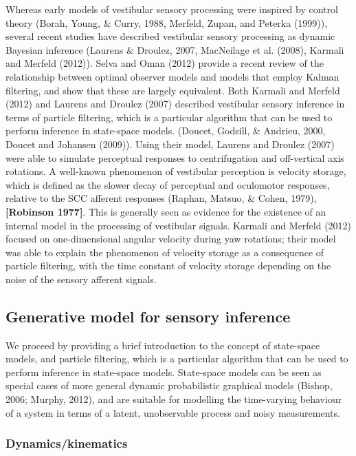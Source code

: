 \documentclass[english,floatsintext,man]{apa6}
\theoremstyle{definition}
\theoremstyle{definition}
\theoremstyle{remark}
\begin{document}
Whereas early models of vestibular sensory processing were inspired by
control theory (Borah, Young, \& Curry, 1988, Merfeld, Zupan, and
Peterka (1999)), several recent studies have described vestibular
sensory processing as dynamic Bayesian inference (Laurens \& Droulez,
2007, MacNeilage et al. (2008), Karmali and Merfeld (2012)). Selva and
Oman (2012) provide a recent review of the relationship between optimal
observer models and models that employ Kalman filtering, and show that
these are largely equivalent. Both Karmali and Merfeld (2012) and
Laurens and Droulez (2007) described vestibular sensory inference in
terms of particle filtering, which is a particular algorithm that can be
used to perform inference in state-space models. (Doucet, Godsill, \&
Andrieu, 2000, Doucet and Johansen (2009)). Using their model, Laurens
and Droulez (2007) were able to simulate perceptual responses to
centrifugation and off-vertical axis rotations. A well-known phenomenon
of vestibular perception is velocity storage, which is defined as the
slower decay of perceptual and oculomotor responses, relative to the SCC
afferent responses (Raphan, Matsuo, \& Cohen, 1979), \textbf{{[}Robinson
1977{]}}. This is generally seen as evidence for the existence of an
internal model in the processing of vestibular signals. Karmali and
Merfeld (2012) focused on one-dimensional angular velocity during yaw
rotations; their model was able to explain the phenomenon of velocity
storage as a consequence of particle filtering, with the time constant
of velocity storage depending on the noise of the sensory afferent
signals.

\subsection{Generative model for sensory
inference}\label{generative-model-for-sensory-inference}

We proceed by providing a brief introduction to the concept of
state-space models, and particle filtering, which is a particular
algorithm that can be used to perform inference in state-space models.
State-space models can be seen as special cases of more general dynamic
probabilistic graphical models (Bishop, 2006; Murphy, 2012), and are
suitable for modelling the time-varying behaviour of a system in terms
of a latent, unobservable process and noisy measurements.

\subsubsection{Dynamics/kinematics}\label{dynamicskinematics}
\end{document}
